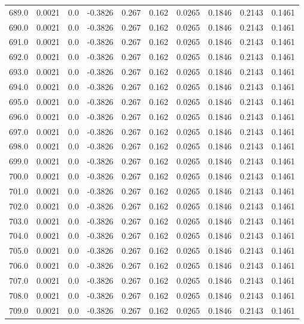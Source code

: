 \begin{longtable}{lrrrrrrrrr}
689.0 & 0.0021 & 0.0 & -0.3826 & 0.267 & 0.162 & 0.0265 & 0.1846 & 0.2143 & 0.1461 \\
690.0 & 0.0021 & 0.0 & -0.3826 & 0.267 & 0.162 & 0.0265 & 0.1846 & 0.2143 & 0.1461 \\
691.0 & 0.0021 & 0.0 & -0.3826 & 0.267 & 0.162 & 0.0265 & 0.1846 & 0.2143 & 0.1461 \\
692.0 & 0.0021 & 0.0 & -0.3826 & 0.267 & 0.162 & 0.0265 & 0.1846 & 0.2143 & 0.1461 \\
693.0 & 0.0021 & 0.0 & -0.3826 & 0.267 & 0.162 & 0.0265 & 0.1846 & 0.2143 & 0.1461 \\
694.0 & 0.0021 & 0.0 & -0.3826 & 0.267 & 0.162 & 0.0265 & 0.1846 & 0.2143 & 0.1461 \\
695.0 & 0.0021 & 0.0 & -0.3826 & 0.267 & 0.162 & 0.0265 & 0.1846 & 0.2143 & 0.1461 \\
696.0 & 0.0021 & 0.0 & -0.3826 & 0.267 & 0.162 & 0.0265 & 0.1846 & 0.2143 & 0.1461 \\
697.0 & 0.0021 & 0.0 & -0.3826 & 0.267 & 0.162 & 0.0265 & 0.1846 & 0.2143 & 0.1461 \\
698.0 & 0.0021 & 0.0 & -0.3826 & 0.267 & 0.162 & 0.0265 & 0.1846 & 0.2143 & 0.1461 \\
699.0 & 0.0021 & 0.0 & -0.3826 & 0.267 & 0.162 & 0.0265 & 0.1846 & 0.2143 & 0.1461 \\
700.0 & 0.0021 & 0.0 & -0.3826 & 0.267 & 0.162 & 0.0265 & 0.1846 & 0.2143 & 0.1461 \\
701.0 & 0.0021 & 0.0 & -0.3826 & 0.267 & 0.162 & 0.0265 & 0.1846 & 0.2143 & 0.1461 \\
702.0 & 0.0021 & 0.0 & -0.3826 & 0.267 & 0.162 & 0.0265 & 0.1846 & 0.2143 & 0.1461 \\
703.0 & 0.0021 & 0.0 & -0.3826 & 0.267 & 0.162 & 0.0265 & 0.1846 & 0.2143 & 0.1461 \\
704.0 & 0.0021 & 0.0 & -0.3826 & 0.267 & 0.162 & 0.0265 & 0.1846 & 0.2143 & 0.1461 \\
705.0 & 0.0021 & 0.0 & -0.3826 & 0.267 & 0.162 & 0.0265 & 0.1846 & 0.2143 & 0.1461 \\
706.0 & 0.0021 & 0.0 & -0.3826 & 0.267 & 0.162 & 0.0265 & 0.1846 & 0.2143 & 0.1461 \\
707.0 & 0.0021 & 0.0 & -0.3826 & 0.267 & 0.162 & 0.0265 & 0.1846 & 0.2143 & 0.1461 \\
708.0 & 0.0021 & 0.0 & -0.3826 & 0.267 & 0.162 & 0.0265 & 0.1846 & 0.2143 & 0.1461 \\
709.0 & 0.0021 & 0.0 & -0.3826 & 0.267 & 0.162 & 0.0265 & 0.1846 & 0.2143 & 0.1461 \\

\end{longtable}
